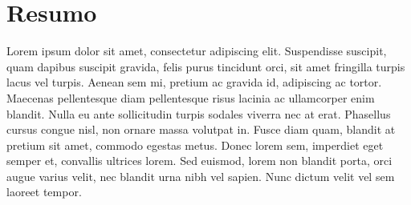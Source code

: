 \cleardoublepage
\chapter*{Resumo}



Lorem ipsum dolor sit amet, consectetur adipiscing elit. Suspendisse suscipit, quam dapibus suscipit gravida, felis purus tincidunt orci, sit amet fringilla turpis lacus vel turpis. Aenean sem mi, pretium ac gravida id, adipiscing ac tortor. Maecenas pellentesque diam pellentesque risus lacinia ac ullamcorper enim blandit. Nulla eu ante sollicitudin turpis sodales viverra nec at erat. Phasellus cursus congue nisl, non ornare massa volutpat in. Fusce diam quam, blandit at pretium sit amet, commodo egestas metus. Donec lorem sem, imperdiet eget semper et, convallis ultrices lorem. Sed euismod, lorem non blandit porta, orci augue varius velit, nec blandit urna nibh vel sapien. Nunc dictum velit vel sem laoreet tempor.
